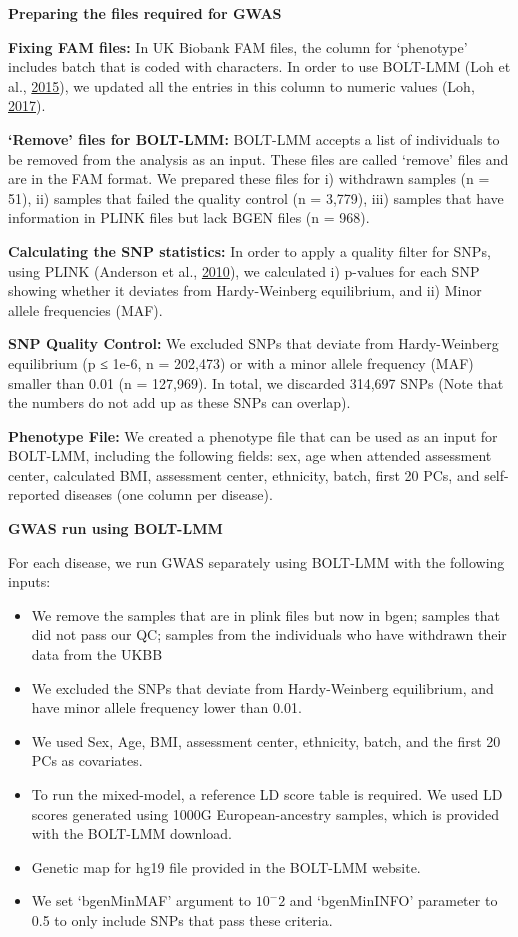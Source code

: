 \documentclass[12pt,twoside]{unicam}
\providecommand{\tightlist}{%
  \setlength{\itemsep}{0pt}\setlength{\parskip}{0pt}}
\begin{document}
\textbf{Preparing the files required for GWAS}

\textbf{Fixing FAM files:} In UK Biobank FAM files, the column for `phenotype' includes batch that is coded with characters. In order to use BOLT-LMM (Loh et al., \protect\hyperlink{ref-Loh2015}{2015}), we updated all the entries in this column to numeric values (Loh, \protect\hyperlink{ref-Loh2017}{2017}).

\textbf{`Remove' files for BOLT-LMM:} BOLT-LMM accepts a list of individuals to be removed from the analysis as an input. These files are called `remove' files and are in the FAM format. We prepared these files for i) withdrawn samples (n = 51), ii) samples that failed the quality control (n = 3,779), iii) samples that have information in PLINK files but lack BGEN files (n = 968).

\textbf{Calculating the SNP statistics:} In order to apply a quality filter for SNPs, using PLINK (Anderson et al., \protect\hyperlink{ref-Anderson2010}{2010}), we calculated i) p-values for each SNP showing whether it deviates from Hardy-Weinberg equilibrium, and ii) Minor allele frequencies (MAF).

\textbf{SNP Quality Control:} We excluded SNPs that deviate from Hardy-Weinberg equilibrium (p ≤ 1e-6, n = 202,473) or with a minor allele frequency (MAF) smaller than 0.01 (n = 127,969). In total, we discarded 314,697 SNPs (Note that the numbers do not add up as these SNPs can overlap).

\textbf{Phenotype File:} We created a phenotype file that can be used as an input for BOLT-LMM, including the following fields: sex, age when attended assessment center, calculated BMI, assessment center, ethnicity, batch, first 20 PCs, and self-reported diseases (one column per disease).

\textbf{GWAS run using BOLT-LMM}

For each disease, we run GWAS separately using BOLT-LMM with the following inputs:

\begin{itemize}
\tightlist
\item
  We remove the samples that are in plink files but now in bgen; samples that did not pass our QC; samples from the individuals who have withdrawn their data from the UKBB
\item
  We excluded the SNPs that deviate from Hardy-Weinberg equilibrium, and have minor allele frequency lower than 0.01.
\item
  We used Sex, Age, BMI, assessment center, ethnicity, batch, and the first 20 PCs as covariates.
\item
  To run the mixed-model, a reference LD score table is required. We used LD scores generated using 1000G European-ancestry samples, which is provided with the BOLT-LMM download.
\item
  Genetic map for hg19 file provided in the BOLT-LMM website.
\item
  We set `bgenMinMAF' argument to \(10^-2\) and `bgenMinINFO' parameter to 0.5 to only include SNPs that pass these criteria.
\end{itemize}
\end{document}
